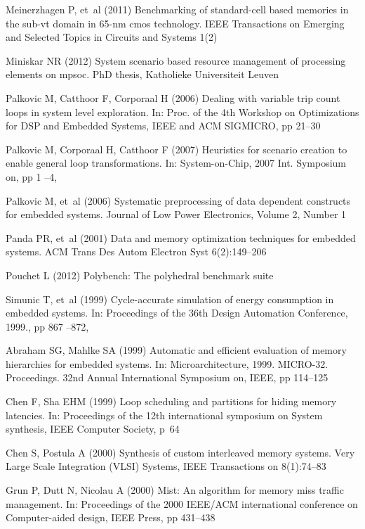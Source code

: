 \documentclass[smallcondensed]{svjour3}
\begin{document}
\begin{thebibliography}{41}
Meinerzhagen P, et~al (2011) Benchmarking of standard-cell based memories in
  the sub-vt domain in 65-nm cmos technology. IEEE Transactions on Emerging and
  Selected Topics in Circuits and Systems 1(2)

Miniskar NR (2012) System scenario based resource management of processing
  elements on mpsoc. PhD thesis, Katholieke Universiteit Leuven

Palkovic M, Catthoor F, Corporaal H (2006{}) Dealing with variable
  trip count loops in system level exploration. In: Proc. of the 4th Workshop
  on Optimizations for DSP and Embedded Systems, IEEE and ACM SIGMICRO, pp
  21--30

Palkovic M, Corporaal H, Catthoor F (2007) Heuristics for scenario creation to
  enable general loop transformations. In: System-on-Chip, 2007 Int. Symposium
  on, pp 1 --4, 

Palkovic M, et~al (2006{}) Systematic preprocessing of data
  dependent constructs for embedded systems. Journal of Low Power Electronics,
  Volume 2, Number 1

Panda PR, et~al (2001) Data and memory optimization techniques for embedded
  systems. ACM Trans Des Autom Electron Syst 6(2):149--206

Pouchet L (2012) Polybench: The polyhedral benchmark suite

Simunic T, et~al (1999) Cycle-accurate simulation of energy consumption in
  embedded systems. In: Proceedings of the 36th Design Automation Conference,
  1999., pp 867 --872, 
  
Abraham SG, Mahlke SA (1999) Automatic and efficient evaluation of memory
  hierarchies for embedded systems. In: Microarchitecture, 1999. MICRO-32.
  Proceedings. 32nd Annual International Symposium on, IEEE, pp 114--125

Chen F, Sha EHM (1999) Loop scheduling and partitions for hiding memory
  latencies. In: Proceedings of the 12th international symposium on System
  synthesis, IEEE Computer Society, p~64

Chen S, Postula A (2000) Synthesis of custom interleaved memory systems. Very
  Large Scale Integration (VLSI) Systems, IEEE Transactions on 8(1):74--83

Grun P, Dutt N, Nicolau A (2000) Mist: An algorithm for memory miss traffic
  management. In: Proceedings of the 2000 IEEE/ACM international conference on
  Computer-aided design, IEEE Press, pp 431--438


\end{thebibliography}
\end{document}
